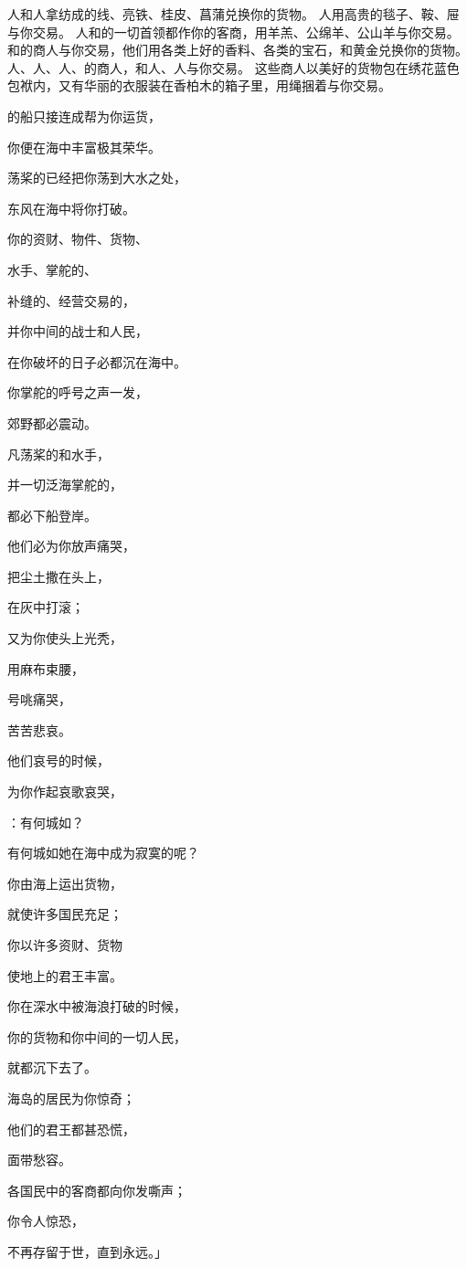 {人和{}人拿纺成的线、亮铁、桂皮、菖蒲兑换你的货物。
人用高贵的毯子、鞍、屉与你交易。
人和{}的一切首领都作你的客商，用羊羔、公绵羊、公山羊与你交易。
和{}的商人与你交易，他们用各类上好的香料、各类的宝石，和黄金兑换你的货物。
人、{}人、{}人、{}的商人，和{}人、{}人与你交易。
这些商人以美好的货物包在绣花蓝色包袱内，又有华丽的衣服装在香柏木的箱子里，用绳捆着与你交易。
\par }{\Q {}的船只接连成帮为你运货，
\par }{\Q 你便在海中丰富极其荣华。
\par }{\Q {}荡桨的已经把你荡到大水之处，
\par }{\Q 东风在海中将你打破。
\par }{\Q {}你的资财、物件、货物、
\par }{\Q 水手、掌舵的、
\par }{\Q 补缝的、经营交易的，
\par }{\Q 并你中间的战士和人民，
\par }{\Q 在你破坏的日子必都沉在海中。
\par }{\Q {}你掌舵的呼号之声一发，
\par }{\Q 郊野都必震动。
\par }{\Q {}凡荡桨的和水手，
\par }{\Q 并一切泛海掌舵的，
\par }{\Q 都必下船登岸。
\par }{\Q {}他们必为你放声痛哭，
\par }{\Q 把尘土撒在头上，
\par }{\Q 在灰中打滚；
\par }{\Q {}又为你使头上光秃，
\par }{\Q 用麻布束腰，
\par }{\Q 号咷痛哭，
\par }{\Q 苦苦悲哀。
\par }{\Q {}他们哀号的时候，
\par }{\Q 为你作起哀歌哀哭，
\par }{：有何城如{}？
\par }{\Q 有何城如她在海中成为寂寞的呢？
\par }{\Q {}你由海上运出货物，
\par }{\Q 就使许多国民充足；
\par }{\Q 你以许多资财、货物
\par }{\Q 使地上的君王丰富。
\par }{\Q {}你在深水中被海浪打破的时候，
\par }{\Q 你的货物和你中间的一切人民，
\par }{\Q 就都沉下去了。
\par }{\Q {}海岛的居民为你惊奇；
\par }{\Q 他们的君王都甚恐慌，
\par }{\Q 面带愁容。
\par }{\Q {}各国民中的客商都向你发嘶声；
\par }{\Q 你令人惊恐，
\par }{\Q 不再存留于世，直到永远。」

}
